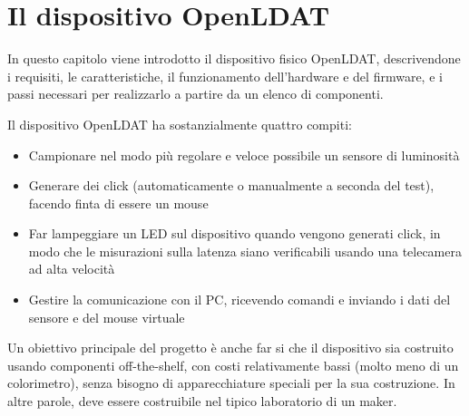 \setlength{\parskip}{1em}
\setlength{\parindent}{0pt}
\chapter{Il dispositivo OpenLDAT}
\label{chap:device}

In questo capitolo viene introdotto il dispositivo fisico OpenLDAT, descrivendone i requisiti, le caratteristiche, il funzionamento dell'hardware e del firmware, e i passi necessari per realizzarlo a partire da un elenco di componenti.

Il dispositivo OpenLDAT ha sostanzialmente quattro compiti:
\begin{itemize}
	\item Campionare nel modo più regolare e veloce possibile un sensore di luminosità
	\item Generare dei click (automaticamente o manualmente a seconda del test), facendo finta di essere un mouse
	\item Far lampeggiare un LED sul dispositivo quando vengono generati click, in modo che le misurazioni sulla latenza siano verificabili usando una telecamera ad alta velocità
	\item Gestire la comunicazione con il PC, ricevendo comandi e inviando i dati del sensore e del mouse virtuale
\end{itemize}

Un obiettivo principale del progetto è anche far si che il dispositivo sia costruito usando componenti off-the-shelf, con costi relativamente bassi (molto meno di un colorimetro), senza bisogno di apparecchiature speciali per la sua costruzione. In altre parole, deve essere costruibile nel tipico laboratorio di un maker.

